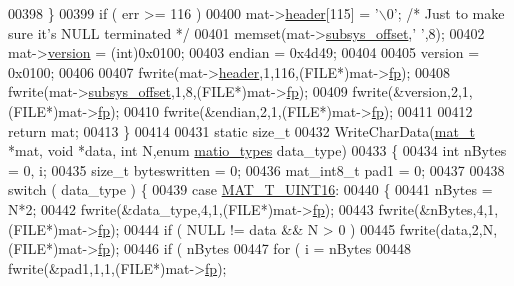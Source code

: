 \begin{DoxyCode}
{{{{00398     \}
00399     \textcolor{keywordflow}{if} ( err >= 116 )
00400         mat->\hyperlink{struct__mat__t_a5ed5d0e4e3c4d76b626a8a1772d579c4}{header}[115] = \textcolor{charliteral}{'\(\backslash\)0'}; \textcolor{comment}{/* Just to make sure it's NULL terminated */}
00401     memset(mat->\hyperlink{struct__mat__t_a19317c01209959d755d69311960d3eec}{subsys\_offset},\textcolor{charliteral}{' '},8);
00402     mat->\hyperlink{struct__mat__t_a729c2bc0afc97485057a5af425635b1a}{version} = (int)0x0100;
00403     endian = 0x4d49;
00404 
00405     version = 0x0100;
00406 
00407     fwrite(mat->\hyperlink{struct__mat__t_a5ed5d0e4e3c4d76b626a8a1772d579c4}{header},1,116,(FILE*)mat->\hyperlink{struct__mat__t_a85f562e407ca9ad4d2a6e14f839432b7}{fp});
00408     fwrite(mat->\hyperlink{struct__mat__t_a19317c01209959d755d69311960d3eec}{subsys\_offset},1,8,(FILE*)mat->\hyperlink{struct__mat__t_a85f562e407ca9ad4d2a6e14f839432b7}{fp});
00409     fwrite(&version,2,1,(FILE*)mat->\hyperlink{struct__mat__t_a85f562e407ca9ad4d2a6e14f839432b7}{fp});
00410     fwrite(&endian,2,1,(FILE*)mat->\hyperlink{struct__mat__t_a85f562e407ca9ad4d2a6e14f839432b7}{fp});
00411 
00412     \textcolor{keywordflow}{return} mat;
00413 \}
00414 
00431 \textcolor{keyword}{static} \textcolor{keywordtype}{size\_t}
00432 WriteCharData(\hyperlink{struct__mat__t}{mat\_t} *mat, \textcolor{keywordtype}{void} *data, \textcolor{keywordtype}{int} N,\textcolor{keyword}{enum} \hyperlink{group___m_a_t_gacf7b3b879282b7ab3a51190e49bf3453}{matio\_types} data\_type)
00433 \{
00434     \textcolor{keywordtype}{int} nBytes = 0, i;
00435     \textcolor{keywordtype}{size\_t} byteswritten = 0;
00436     mat\_int8\_t pad1 = 0;
00437 
00438     \textcolor{keywordflow}{switch} ( data\_type ) \{
00439         \textcolor{keywordflow}{case} \hyperlink{group___m_a_t_ggacf7b3b879282b7ab3a51190e49bf3453a05bc7af7680aa68be95126ae0a4c2e31}{MAT\_T\_UINT16}:
00440         \{
00441             nBytes = N*2;
00442             fwrite(&data\_type,4,1,(FILE*)mat->\hyperlink{struct__mat__t_a85f562e407ca9ad4d2a6e14f839432b7}{fp});
00443             fwrite(&nBytes,4,1,(FILE*)mat->\hyperlink{struct__mat__t_a85f562e407ca9ad4d2a6e14f839432b7}{fp});
00444             \textcolor{keywordflow}{if} ( NULL != data && N > 0 )
00445                 fwrite(data,2,N,(FILE*)mat->\hyperlink{struct__mat__t_a85f562e407ca9ad4d2a6e14f839432b7}{fp});
00446             \textcolor{keywordflow}{if} ( nBytes %
00447                 \textcolor{keywordflow}{for} ( i = nBytes %
00448                     fwrite(&pad1,1,1,(FILE*)mat->\hyperlink{struct__mat__t_a85f562e407ca9ad4d2a6e14f839432b7}{fp});
}}}}
\end{DoxyCode}
